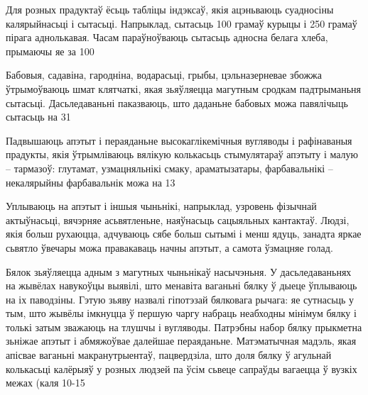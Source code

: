 Для розных прадуктаў ёсьць табліцы індэксаў, якія ацэньваюць суадносіны калярыйнасьці і сытасьці. Напрыклад, сытасьць 100 грамаў курыцы і 250 грамаў пірага аднолькавая. Часам параўноўваюць сытасьць адносна белага хлеба, прымаючы яе за 100%

Бабовыя, садавіна, гародніна, водарасьці, грыбы, цэльназерневае збожжа ўтрымоўваюць шмат клятчаткі, якая зьяўляецца магутным сродкам падтрыманьня сытасьці. Дасьледаваньні паказваюць, што даданьне бабовых можа павялічыць сытасьць на 31%

Падвышаюць апэтыт і пераяданьне высокаглікемічныя вугляводы і рафінаваныя прадукты, якія ўтрымліваюць вялікую колькасьць стымулятараў апэтыту і малую – тармазоў: глутамат, узмацняльнікі смаку, араматызатары, фарбавальнікі – некалярыйны фарбавальнік можа на 13%

Уплываюць на апэтыт і іншыя чыньнікі, напрыклад, узровень фізычнай актыўнасьці, вячэрняе асьвятленьне, наяўнасьць сацыяльных кантактаў. Людзі, якія больш рухаюцца, адчуваюць сябе больш сытымі і менш ядуць, занадта яркае сьвятло ўвечары можа правакаваць начны апэтыт, а самота ўзмацняе голад.

Бялок зьяўляецца адным з магутных чыньнікаў насычэньня. У дасьледаваньнях на жывёлах навукоўцы выявілі, што менавіта ваганьні бялку ў дыеце ўплываюць на іх паводзіны. Гэтую зьяву назвалі гіпотэзай бялковага рычага: яе сутнасьць у тым, што жывёлы імкнуцца ў першую чаргу набраць неабходны мінімум бялку і толькі затым зважаюць на тлушчы і вугляводы. Патрэбны набор бялку прыкметна зьніжае апэтыт і абмяжоўвае далейшае пераяданьне. Матэматычная мадэль, якая апісвае ваганьні макранутрыентаў, пацвердзіла, што доля бялку ў агульнай колькасьці калёрыяў у розных людзей па ўсім сьвеце сапраўды вагаецца ў вузкіх межах (каля 10-15%

